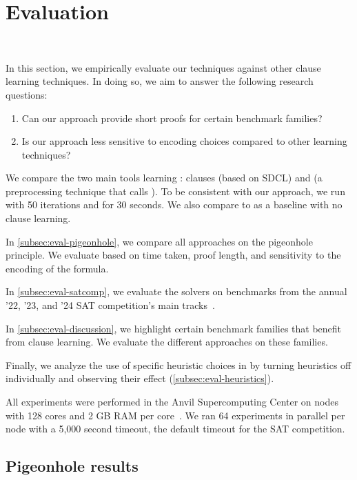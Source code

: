 \section{Evaluation}~\label{sec:evaluation}

In this section, we empirically evaluate our techniques against other \pr clause
learning techniques. In doing so, we aim to answer the following research questions:


\begin{enumerate}
    \item Can our approach provide short \pr proofs for certain benchmark families?
    \item Is our approach less sensitive to encoding choices compared to other
    \pr learning techniques?
\end{enumerate}


We compare the two main tools learning \pr: clauses \sadical (based on SDCL)
and \prelearn (a preprocessing technique that calls \sadical). To be consistent with our approach,
we run \prelearn with 50 iterations and for 30 seconds. We also compare to \cadical as a baseline with no \pr clause learning.

In \autoref{subsec:eval-pigeonhole}, we compare all approaches
on the pigeonhole principle. We evaluate based on time taken, proof length, and sensitivity to the encoding of the formula. 

In \autoref{subsec:eval-satcomp}, we evaluate the solvers on benchmarks from the
annual '22, '23, and '24 SAT competition's main
tracks~\cite{satcomp2022,satcomp2023,satcomp2024}.

In \autoref{subsec:eval-discussion}, we highlight certain benchmark families
that benefit from \pr clause learning. We evaluate the different approaches on these families.


Finally, we analyze the use of specific heuristic choices in \tool
by turning heuristics off individually and observing their effect (\autoref{subsec:eval-heuristics}). 

All experiments were performed in the Anvil Supercomputing Center on nodes with
128 cores and 2 GB RAM per core~\cite{anvil}. We ran 64 experiments in parallel per node
with a 5,000 second timeout, the default timeout for the SAT competition.

\subsection{Pigeonhole results}~\label{subsec:eval-pigeonhole}

